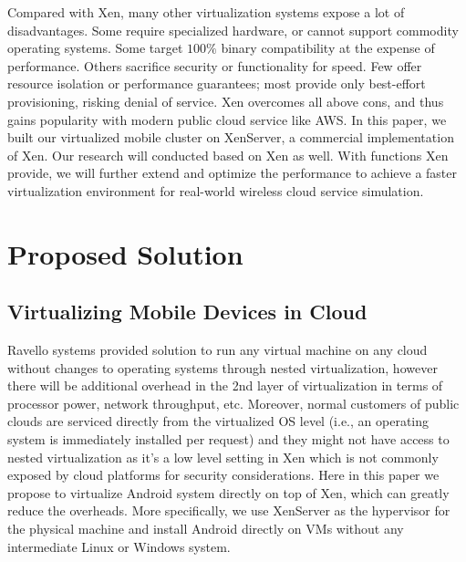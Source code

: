 \documentclass[journal,comsoc]{IEEEtran}
\begin{document}

Compared with Xen, many other virtualization systems expose a lot of disadvantages. Some require specialized hardware, or cannot support commodity operating systems. Some target $100\%$ binary compatibility at the expense of performance. Others sacrifice security or functionality for speed. Few offer resource isolation or performance guarantees; most provide only best-effort provisioning, risking denial of service. Xen overcomes all above cons, and thus gains popularity with modern public cloud service like AWS. In this paper, we built our virtualized mobile cluster on XenServer, a commercial implementation of Xen. Our research will conducted based on Xen as well. With functions Xen provide, we will further extend and optimize the performance to achieve a faster virtualization environment for real-world wireless cloud service simulation.

\section{Proposed Solution}
\subsection{Virtualizing Mobile Devices in Cloud}
Ravello systems provided solution to run any virtual machine on any cloud without changes to operating systems through nested virtualization, however there will be additional overhead in the 2nd layer of virtualization in terms of processor power, network throughput, etc. Moreover, normal customers of public clouds are serviced directly from the virtualized OS level (i.e., an operating system is immediately installed per request) and they might not have access to nested virtualization as it's a low level setting in Xen which is not commonly exposed by cloud platforms for security considerations. Here in this paper we propose to virtualize Android system directly on top of Xen, which can greatly reduce the overheads. More specifically, we use XenServer as the hypervisor for the physical machine and install Android directly on VMs without any intermediate Linux or Windows system.
\end{document}
